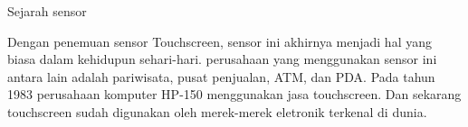 Sejarah sensor

Dengan penemuan sensor Touchscreen, sensor ini akhirnya menjadi hal yang biasa dalam 
kehidupun sehari-hari. perusahaan yang menggunakan sensor ini antara lain adalah pariwisata, 
pusat penjualan, ATM, dan PDA. Pada tahun 1983 perusahaan komputer HP-150 menggunakan jasa 
touchscreen. Dan sekarang touchscreen sudah digunakan oleh merek-merek eletronik terkenal di dunia.